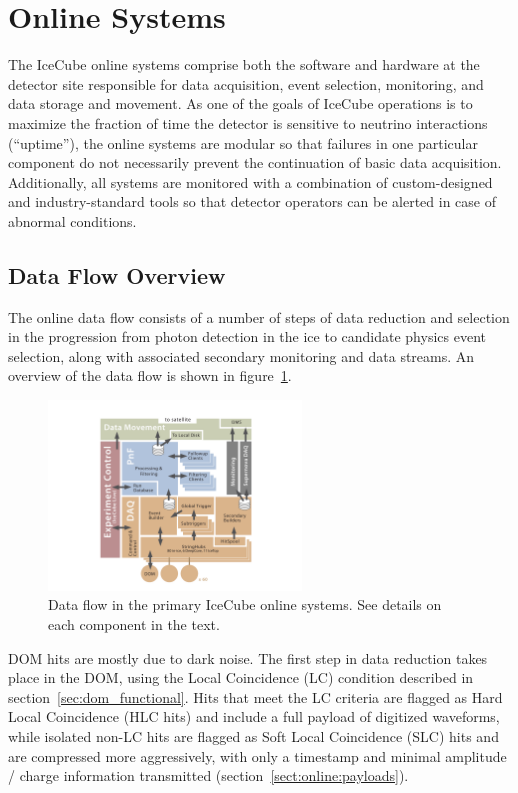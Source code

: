 \section{\label{sect:online}Online Systems}

The IceCube online systems comprise both the software and hardware at the
detector site responsible for data acquisition, event selection,
monitoring, and data storage and movement.  As one of the goals of IceCube
operations is to maximize the fraction of time the detector is sensitive to
neutrino interactions (``uptime''), the online systems are modular so that
failures in one particular component do not necessarily prevent the
continuation of basic data acquisition. Additionally, all systems are
monitored with a combination of custom-designed and industry-standard tools
so that detector operators can be alerted in case of abnormal conditions.

\subsection{\label{sect:online:dataflow}Data Flow Overview}

The online data flow consists of a number of steps of data reduction and
selection in the progression from photon detection in the ice to
candidate physics event selection, along with associated secondary
monitoring and data streams.  An overview of the data flow is shown in
figure~\ref{fig:online_dataflow}.

\begin{figure}[!ht]
 \centering
 \includegraphics[width=0.6\textwidth]{graphics/online/online_dataflow.pdf}
 \caption{Data flow in the primary IceCube online systems. See details
   on each component in the text.}
 \label{fig:online_dataflow}
\end{figure}

DOM hits are mostly due to dark noise. The first step
in data reduction takes place in the DOM, using the Local Coincidence (LC) condition described in
section~\ref{sec:dom_functional}.  Hits that meet the LC criteria are flagged
as Hard Local Coincidence (HLC hits) and include a full payload of
digitized waveforms, while isolated non-LC hits are flagged as Soft Local
Coincidence (SLC) hits and are compressed more aggressively, with only a
timestamp and minimal amplitude / charge information transmitted
(section~\ref{sect:online:payloads}). 

